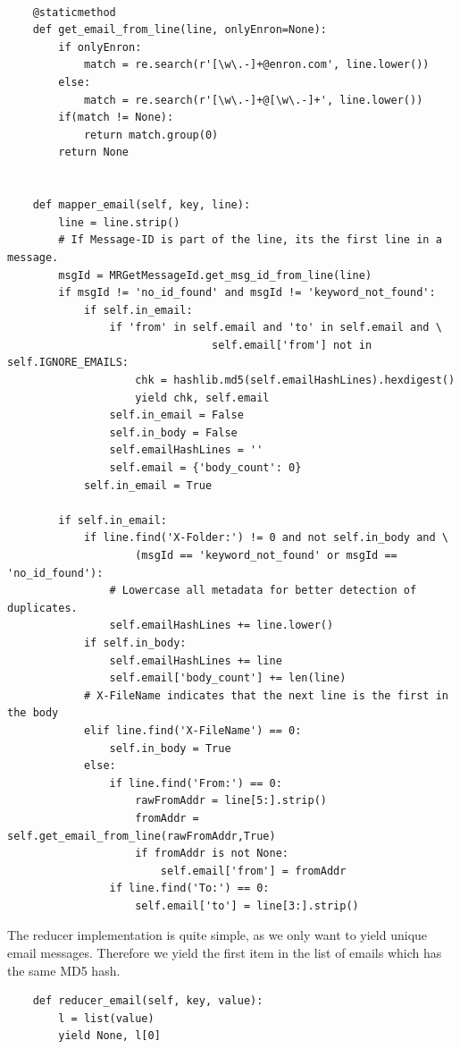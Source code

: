 \documentclass[runningheads,a4paper]{llncs}
\begin{document}
\begin{verbatim}

    @staticmethod
    def get_email_from_line(line, onlyEnron=None):
        if onlyEnron:
            match = re.search(r'[\w\.-]+@enron.com', line.lower())
        else:
            match = re.search(r'[\w\.-]+@[\w\.-]+', line.lower())
        if(match != None):
            return match.group(0)
        return None
        
        
    def mapper_email(self, key, line):
        line = line.strip()
        # If Message-ID is part of the line, its the first line in a message.
        msgId = MRGetMessageId.get_msg_id_from_line(line)
        if msgId != 'no_id_found' and msgId != 'keyword_not_found':
            if self.in_email:
                if 'from' in self.email and 'to' in self.email and \
                                self.email['from'] not in self.IGNORE_EMAILS:
                    chk = hashlib.md5(self.emailHashLines).hexdigest()
                    yield chk, self.email
                self.in_email = False
                self.in_body = False
                self.emailHashLines = ''
                self.email = {'body_count': 0}
            self.in_email = True

        if self.in_email:
            if line.find('X-Folder:') != 0 and not self.in_body and \
                    (msgId == 'keyword_not_found' or msgId == 'no_id_found'):
                # Lowercase all metadata for better detection of duplicates.
                self.emailHashLines += line.lower()
            if self.in_body:
                self.emailHashLines += line
                self.email['body_count'] += len(line)
            # X-FileName indicates that the next line is the first in the body
            elif line.find('X-FileName') == 0:
                self.in_body = True
            else:
                if line.find('From:') == 0:
                    rawFromAddr = line[5:].strip()
                    fromAddr = self.get_email_from_line(rawFromAddr,True)
                    if fromAddr is not None:
                        self.email['from'] = fromAddr
                if line.find('To:') == 0:
                    self.email['to'] = line[3:].strip()
\end{verbatim}

The reducer implementation is quite simple, as we only want to yield unique email messages. Therefore we yield the first item in the list of emails which has the same MD5 hash.

\begin{verbatim}
    def reducer_email(self, key, value):
        l = list(value)
        yield None, l[0]
\end{verbatim}
\end{document}
